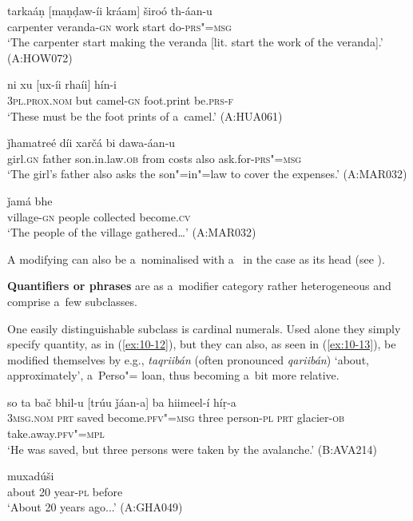 \begin{exe}
\ex
\label{ex:10-8}
\gll tarkaáṇ [maṇḍaw-íi kráam] široó th-áan-u  \\
carpenter veranda-\textsc{gn} work start do-\textsc{prs"=msg} \\
\glt `The carpenter start making the veranda [lit. start the work of the veranda].' (A:HOW072)

\ex
\label{ex:10-9}
\gll ni xu [ux-íi rhaíi] hín-i \\
\textsc{3pl.prox.nom} but camel-\textsc{gn} foot.print be.\textsc{prs-f}  \\
\glt `These must be the foot prints of a~camel.' (A:HUA061)

\ex
\label{ex:10-10}
 ǰhamatreé díi xarčá bi dawa-áan-u \\
girl.\textsc{gn} father son.in.law.\textsc{ob} from costs also ask.for-\textsc{prs"=msg} \\
\glt `The girl's father also asks the son"=in"=law to cover the expenses.' (A:MAR032)

\ex
\label{ex:10-11}
\gll [díiš-e xálak] ǰamá bhe \\
village-\textsc{gn} people collected become.\textsc{cv} \\
\glt `The people of the village gathered{\ldots}' (A:MAR032)
\end{exe}

A modifying   can also be a~nominalised  with a~ in the  case as its head (see ).


\textbf{Quantifiers or  phrases} are as a~modifier category rather heterogeneous and comprise a~few subclasses.  


One easily distinguishable subclass is cardinal numerals. Used alone they simply specify quantity, as in (\ref{ex:10-12}), but they can also, as seen in (\ref{ex:10-13}), be modified themselves by e.g., \textit{taqriibán} (often pronounced \textit{qariibán}) `about, approximately', a~Perso"= loan, thus becoming a~bit more relative.

\begin{exe}
\ex
\label{ex:10-12}
\gll so ta bač bhil-u [trúu ǰáan-a] ba hiimeel-í híṛ-a  \\
\textsc{3msg.nom} \textsc{prt} saved become.\textsc{pfv"=msg} three  person-\textsc{pl} \textsc{prt} glacier-\textsc{ob} take.away.\textsc{pfv"=mpl} \\
\glt `He was saved, but three persons were taken by the avalanche.' (B:AVA214)

\ex
\label{ex:10-13}
 muxadúši  \\
about 20 year-\textsc{pl} before \\
\glt `About 20 years ago...' (A:GHA049)
\end{exe}


